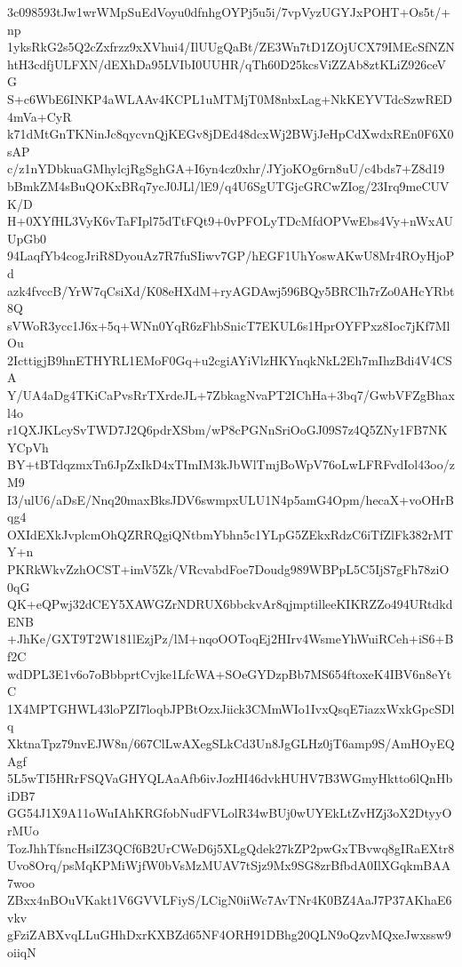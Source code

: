 3c098593tJw1wrWMpSuEdVoyu0dfnhgOYPj5u5i/7vpVyzUGYJxPOHT+Os5t/+np
1yksRkG2s5Q2cZxfrzz9xXVhui4/IlUUgQaBt/ZE3Wn7tD1ZOjUCX79IMEcSfNZN
htH3cdfjULFXN/dEXhDa95LVIbI0UUHR/qTh60D25kcsViZZAb8ztKLiZ926ceVG
S+c6WbE6INKP4aWLAAv4KCPL1uMTMjT0M8nbxLag+NkKEYVTdcSzwRED4mVa+CyR
k71dMtGnTKNinJc8qycvnQjKEGv8jDEd48dcxWj2BWjJeHpCdXwdxREn0F6X0sAP
c/z1nYDbkuaGMhylcjRgSghGA+I6yn4cz0xhr/JYjoKOg6rn8uU/c4bds7+Z8d19
bBmkZM4sBuQOKxBRq7ycJ0JLl/lE9/q4U6SgUTGjcGRCwZIog/23Irq9meCUVK/D
H+0XYfHL3VyK6vTaFIpl75dTtFQt9+0vPFOLyTDcMfdOPVwEbs4Vy+nWxAUUpGb0
94LaqfYb4cogJriR8DyouAz7R7fuSIiwv7GP/hEGF1UhYoswAKwU8Mr4ROyHjoPd
azk4fvccB/YrW7qCsiXd/K08eHXdM+ryAGDAwj596BQy5BRCIh7rZo0AHcYRbt8Q
sVWoR3ycc1J6x+5q+WNn0YqR6zFhbSnicT7EKUL6s1HprOYFPxz8Ioc7jKf7MlOu
2IcttigjB9hnETHYRL1EMoF0Gq+u2cgiAYiVlzHKYnqkNkL2Eh7mIhzBdi4V4CSA
Y/UA4aDg4TKiCaPvsRrTXrdeJL+7ZbkagNvaPT2IChHa+3bq7/GwbVFZgBhaxl4o
r1QXJKLcySvTWD7J2Q6pdrXSbm/wP8cPGNnSriOoGJ09S7z4Q5ZNy1FB7NKYCpVh
BY+tBTdqzmxTn6JpZxIkD4xTImIM3kJbWlTmjBoWpV76oLwLFRFvdIol43oo/zM9
I3/ulU6/aDsE/Nnq20maxBksJDV6swmpxULU1N4p5amG4Opm/hecaX+voOHrBqg4
OXIdEXkJvplcmOhQZRRQgiQNtbmYbhn5c1YLpG5ZEkxRdzC6iTfZlFk382rMTY+n
PKRkWkvZzhOCST+imV5Zk/VRcvabdFoe7Doudg989WBPpL5C5IjS7gFh78ziO0qG
QK+eQPwj32dCEY5XAWGZrNDRUX6bbckvAr8qjmptilleeKIKRZZo494URtdkdENB
+JhKe/GXT9T2W181lEzjPz/lM+nqoOOToqEj2HIrv4WsmeYhWuiRCeh+iS6+Bf2C
wdDPL3E1v6o7oBbbprtCvjke1LfcWA+SOeGYDzpBb7MS654ftoxeK4IBV6n8eYtC
1X4MPTGHWL43loPZI7loqbJPBtOzxJiick3CMmWIo1IvxQsqE7iazxWxkGpcSDlq
XktnaTpz79nvEJW8n/667ClLwAXegSLkCd3Un8JgGLHz0jT6amp9S/AmHOyEQAgf
5L5wTI5HRrFSQVaGHYQLAaAfb6ivJozHI46dvkHUHV7B3WGmyHktto6lQnHbiDB7
GG54J1X9A11oWuIAhKRGfobNudFVLolR34wBUj0wUYEkLtZvHZj3oX2DtyyOrMUo
TozJhhTfsncHsiIZ3QCf6B2UrCWeD6j5XLgQdek27kZP2pwGxTBvwq8gIRaEXtr8
Uvo8Orq/psMqKPMiWjfW0bVsMzMUAV7tSjz9Mx9SG8zrBfbdA0IlXGqkmBAA7woo
ZBxx4nBOuVKakt1V6GVVLFiyS/LCigN0iiWc7AvTNr4K0BZ4AaJ7P37AKhaE6vkv
gFziZABXvqLLuGHhDxrKXBZd65NF4ORH91DBhg20QLN9oQzvMQxeJwxssw9oiiqN
